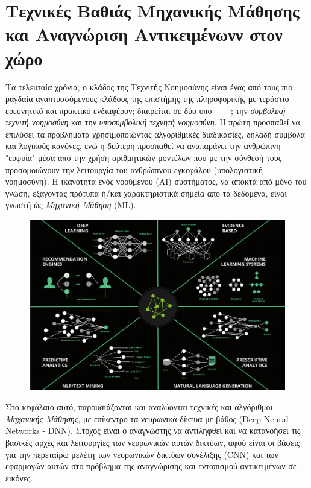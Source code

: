 \chapter{Τεχνικές Βαθιάς Μηχανικής Μάθησης και Αναγνώριση Αντικειμένωνν στον χώρο}
\label{chapter:theory}

Τα τελευταία χρόνια, ο κλάδος της Τεχνιτής Νοημοσύνης είναι ένας από τους πιο ραγδαία
αναπτυσσόμενους κλάδους της επιστήμης της πληροφορικής με τεράστιο
ερευνητικό και πρακτικό ενδιαφέρον; διαιρείται σε δύο υπο\_\_\_; την \emph{συμβολική τεχνιτή
νοημοσύνη} και την \emph{υποσυμβολική τεχνητή νοημοσύνη}. Η πρώτη προσπαθεί να
επιλύσει τα προβλήματα χρησιμοποιώντας αλγοριθμικές διαδικασίες, δηλαδή
σύμβολα και λογικούς κανόνες, ενώ η δεύτερη προσπαθεί να αναπαράγει την
ανθρώπινη "ευφυία" μέσα από την χρήση αριθμητικών μοντέλων
που με την σύνθεσή τους προσομοιώνουν την λειτουργία του ανθρώπινου εγκεφάλου
(υπολογιστική νοημοσύνη).
Η ικανότητα ενός νοούμενου (AI) συστήματος, να αποκτά από μόνο του γνώση,
εξάγοντας πρότυπα ή/και χαρακτηριστικά σημεία από τα δεδομένα,
είναι γνωστή ώς \emph{Μηχανική Μάθηση} (ML).
\begin{figure}[H]
  \centering
  \includegraphics[width=1\textwidth]{./images/chapter3/AI_1.jpg}
  \label{fig:AI_1}
\end{figure}

Στο κεφάλαιο αυτό, παρουσιάζονται και αναλύονται τεχνικές και αλγόριθμοι
\emph{Μηχανικής Μάθησης}, με επίκεντρο τα νευρωνικά δίκτυα με βάθος (Deep Neural Networks - DNN).
Στόχος είναι ο αναγνώστης να αντιληφθεί και να κατανοήσει τις βασικές αρχές και
λειτουργίες των νευρωνικών αυτών δικτύων, αφού είναι οι βάσεις για την περεταίρω
μελέτη των νευρωνικών δικτύων συνέλιξης (CNN) και των εφαρμογών αυτών στο
πρόβλημα της αναγνώρισης και εντοπισμού αντικειμένων σε εικόνες.





